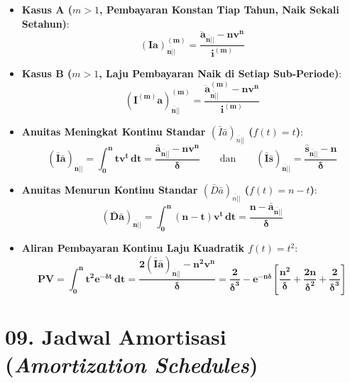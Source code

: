 \documentclass[10pt,a4paper]{article}
\newcommand{\angl}[1]{\overline{#1|}}
\newcommand{\ia}{(Ia)}
\newcommand{\iba}{(\bar{I}\bar{a})}
\newcommand{\dba}{(\bar{D}\bar{a})}
\newcommand{\ibs}{(\bar{I}\bar{s})}
\begin{document}
\begin{jebakanbox}
\begin{itemize}[leftmargin=1.5em, topsep=1.5pt, itemsep=2pt]
    \item \textbf{Kasus A ($m > 1$, Pembayaran Konstan Tiap Tahun, Naik Sekali Setahun)}:
    \begin{equation*}
        \mathbf{\ia_{\angl{n}|}^{(m)} = \frac{\ddot{a}_{\angl{n}|} - n v^n}{i^{(m)}}}
    \end{equation*}
    \item \textbf{Kasus B ($m > 1$, Laju Pembayaran Naik di Setiap Sub-Periode)}:
    \begin{equation*}
        \mathbf{(I^{(m)} a)_{\angl{n}|}^{(m)} = \frac{\ddot{a}_{\angl{n}|}^{(m)} - n v^n}{i^{(m)}}}
    \end{equation*}
    \item \textbf{Anuitas Meningkat Kontinu Standar $\iba_{\angl{n}|}$ ($f(t) = t$)}:
    \begin{equation*}
        \mathbf{\iba_{\angl{n}|} = \int_0^n t v^t \, dt = \frac{\bar{a}_{\angl{n}|} - n v^n}{\delta}} \qquad\text{dan}\qquad \mathbf{\ibs_{\angl{n}|} = \frac{\bar{s}_{\angl{n}|} - n}{\delta}}
    \end{equation*}
    \item \textbf{Anuitas Menurun Kontinu Standar $\dba_{\angl{n}|}$ ($f(t) = n - t$)}:
    \begin{equation*}
        \mathbf{\dba_{\angl{n}|} = \int_0^n (n - t) v^t \, dt = \frac{n - \bar{a}_{\angl{n}|}}{\delta}}
    \end{equation*}
    \item \textbf{Aliran Pembayaran Kontinu Laju Kuadratik $f(t) = t^2$}:
    \begin{equation*}
        \mathbf{PV = \int_0^n t^2 e^{-\delta t} \, dt = \frac{2\iba_{\angl{n}|} - n^2 v^n}{\delta} = \frac{2}{\delta^3} - e^{-n\delta} \left[ \frac{n^2}{\delta} + \frac{2n}{\delta^2} + \frac{2}{\delta^3} \right]}
    \end{equation*}
\end{itemize}
\end{jebakanbox}

\section*{\large 09. Jadwal Amortisasi (\textit{Amortization Schedules})}
\end{document}
